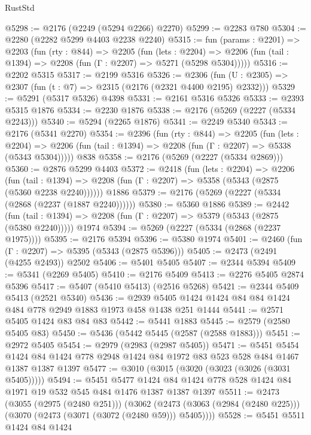 \begin{lexlean}{RustStd}
\begin{coremodule}
{\begin{coremodule}
{{{{{{{{{{@5298 := @2176 (@2249 (@5294 @2266) @2270)
@5299 := @2283 @780
@5304 := @2280 (@2282 @5299 @4403 @2238 @2240)
@5315 := fun (params : @2201) =>
  @2203
    (fun (rty : @844) =>
    @2205
      (fun (lets : @2204) =>
      @2206 (fun (tail : @1394) => @2208 (fun (Γ : @2207) => @5271 (@5298 @5304)))))
@5316 := @2202 @5315
@5317 := @2199 @5316
@5326 := @2306 (fun (U : @2305) => @2307 (fun (t : @7) => @2315 (@2176 (@2321 @4400 @2195) @2332)))
@5329 := @5291 (@5317 @5326) @4398
@5331 := @2161 @5316 @5326
@5333 := @2393 @5315 @1876
@5334 := @2230 @1876
@5338 := @2176 (@5269 (@2227 (@5334 @2243)))
@5340 := @5294 (@2265 @1876)
@5341 := @2249 @5340
@5343 := @2176 (@5341 @2270)
@5354 := @2396
    (fun (rty : @844) =>
    @2205
      (fun (lets : @2204) =>
      @2206 (fun (tail : @1394) => @2208 (fun (Γ : @2207) => @5338 (@5343 @5304)))))
    @838
@5358 := @2176 (@5269 (@2227 (@5334 @2869)))
@5360 := @2876 @5299 @4403
@5372 := @2418
    (fun (lets : @2204) =>
    @2206
      (fun (tail : @1394) => @2208 (fun (Γ : @2207) => @5358 (@5343 (@2875 (@5360 @2238 @2240))))))
    @1886
@5379 := @2176 (@5269 (@2227 (@5334 (@2868 (@2237 (@1887 @2240))))))
@5380 := @5360 @1886
@5389 := @2442
    (fun (tail : @1394) => @2208 (fun (Γ : @2207) => @5379 (@5343 (@2875 (@5380 @2240)))))
    @1974
@5394 := @5269 (@2227 (@5334 (@2868 (@2237 @1975))))
@5395 := @2176 @5394
@5396 := @5380 @1974
@5401 := @2460 (fun (Γ : @2207) => @5395 (@5343 (@2875 @5396)))
@5405 := @2473 (@2491 (@4255 @2493)) @2502
@5406 := @5401 @5405
@5407 := @2344 @5394
@5409 := @5341 (@2269 @5405)
@5410 := @2176 @5409
@5413 := @2276 @5405 @2874 @5396
@5417 := @5407 (@5410 @5413) (@2516 @5268)
@5421 := @2344 @5409 @5413 (@2521 @5340)
@5436 := @2939 @5405 @1424 @1424 @84 @84 @1424 @484 @778 @2949 @1883 @1973 @458 @1438 @251 @1444
@5441 := @2571 @5405 @1424 @83 @84 @83
@5442 := @5441 @1883
@5445 := @2579 (@2580 @5405 @83)
@5450 := @5436 (@5442 @5445 (@2587 (@2588 @1883)))
@5451 := @2972 @5405
@5454 := @2979 (@2983 (@2987 @5405))
@5471 := @5451
    @5454
    @1424
    @84
    @1424
    @778
    @2948
    @1424
    @84
    @1972
    @83
    @523
    @528
    @484
    @1467
    @1387
    @1387
    @1397
@5477 := @3010 (@3015 (@3020 (@3023 (@3026 (@3031 @5405)))))
@5494 := @5451
    @5477
    @1424
    @84
    @1424
    @778
    @528
    @1424
    @84
    @1971
    @19
    @532
    @545
    @484
    @1476
    @1387
    @1387
    @1397
@5511 := @2473
    (@3055 (@2975 (@2480 @251)))
    (@3062 (@2473 (@3063 (@2984 (@2480 @225))) (@3070 (@2473 (@3071 (@3072 (@2480 @59))) @5405))))
@5528 := @5451
    @5511
    @1424
    @84
    @1424
}}}}}}}}}}
\end{coremodule}}
\end{coremodule}
\end{lexlean}

